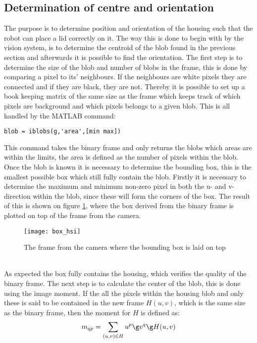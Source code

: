 \subsection{Determination of centre and orientation}
The purpose is to determine position and orientation of the housing such that the robot can place a lid correctly on it. The way this is done to begin with by the vision system, is to determine the centroid of the blob found in the previous section and afterwards it is possible to find the orientation. The first step is to determine the size of the blob and number of blobs in the frame, this is done by comparing a pixel to its' neighbours. If the neighbours are white pixels they are connected and if they are black, they are not. Thereby it is possible to set up a book keeping matrix of the same size as the frame which keeps track of which pixels are background and which pixels belongs to a given blob. This is all handled by the MATLAB command: \citep{vision}
\begin{lstlisting}
blob = iblobs(g,'area',[min max])
\end{lstlisting}    
This command takes the binary frame and only returns the blobs which areas are within the limits, the area is defined as the number of pixels within the blob. Once the blob is known it is necessary to determine the bounding box, this is the smallest possible box which still fully contain the blob. Firstly it is necessary to determine the maximum and minimum non-zero pixel in both the u- and v-direction within the blob, since these will form the corners of the box.  The result of this is shown on figure \ref{fig_bound_box}, where the box derived from the binary frame is plotted on top of the frame from the camera. \citep{vision}
\begin{figure}[htbp!]
	\centering
	\texttt{[image: box\_hsi]}
	\caption{The frame from the camera where the bounding box is laid on top}
	\label{fig_bound_box}
\end{figure}\\
As expected the box fully contains the housing, which verifies the quality of the binary frame. The next step is to calculate the center of the blob, this is done using the image moment. If the all the pixels within the housing blob and only these is said to be contained in the new frame $H(u,v)$, which is the same size as the binary frame, then the moment for $H$ is defined as: \citep{vision}
\begin{equation}
m_{qp}=\sum_{(u,v)\in H} u^p\g v^q\g H(u,v)
\end{equation} 
